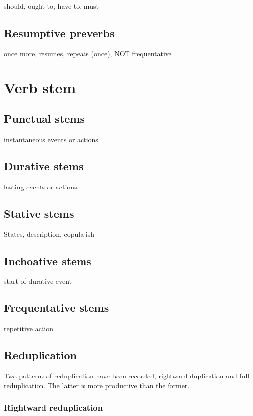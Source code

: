 \documentclass[smallroyalvopaper,9pt]{memoir}
\begin{document}
should, ought to, have to, must

\subsection{Resumptive preverbs}

once more, resumes, repeats (once), NOT frequentative

\section{Verb stem}

\subsection{Punctual stems}

instantaneous events or actions

\subsection{Durative stems}

lasting events or actions

\subsection{Stative stems}

States, description, copula-ish

\subsection{Inchoative stems}

start of durative event

\subsection{Frequentative stems}

repetitive action

\subsection{Reduplication}

Two patterns of reduplication have been recorded, rightward duplication and full reduplication. The latter is more productive than the former.

\subsubsection{Rightward reduplication}
\end{document}
